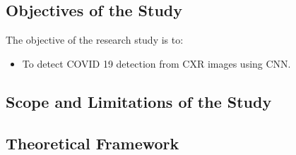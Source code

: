 
\subsection{Objectives of the Study}

The objective of the research study is to:
\begin{itemize}
    \item  To detect COVID 19 detection from CXR images using CNN. 
\end{itemize}

\subsection{Scope and Limitations of the Study}

\subsection{Theoretical Framework}

